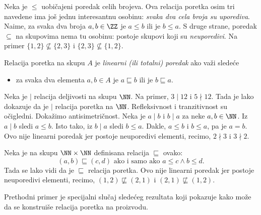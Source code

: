 Neka je $\le$ uobi\v cajeni poredak celih brojeva. Ova relacija poretka osim tri navedene ima jo\v s jednu
interesantnu osobinu: \emph{svaka dva cela broja su uporediva}.
Naime, za svaka dva broja $a, b \in \ZZ$ je $a \le b$ ili je $b \le a$.
S druge strane, poredak $\subseteq$ na skupovima nema tu osobinu: postoje skupovi koji su \emph{neuporedivi}.
Na primer $\{1, 2\} \not\subseteq \{2, 3\}$ i $\{2, 3\} \not\subseteq \{1, 2\}$.

Relacija poretka na skupu $A$ je \emph{linearni (ili totalni) poredak} ako va\v zi slede\'ce
\begin{itemize}\itemsep -1.5pt
\item
  za svaka dva elementa $a, b \in A$ je $a \sqsubseteq b$ ili je $b \sqsubseteq a$.
\end{itemize}

\begin{EX}\label{ft07.ex.deljivost}
  Neka je $\mid$ relacija deljivosti na skupu $\NN$. Na primer, $3 \mid 12$ i $5 \nmid 12$. Tada je lako dokazuje da je
  $\mid$ relacija poretka na $\NN$. Refleksivnost i tranzitivnost su o\v cigledni. Doka\v zimo antisimetri\v cnost.
  Neka je $a \mid b$ i $b \mid a$ za neke $a, b \in \NN$. Iz $a \mid b$ sledi $a \le b$. Isto tako, iz $b \mid a$ sledi
  $b \le a$. Dakle, $a \le b$ i $b \le a$, pa je $a = b$. Ovo nije linearni poredak jer postoje neuporedivi elementi,
  recimo, $2 \nmid 3$ i $3 \nmid 2$.
\end{EX}

\begin{EX}
  Neka je na skupu $\NN \times \NN$ definisana relacija $\sqsubseteq$ ovako:
  $$
    (a, b) \sqsubseteq (c, d) \text{\ \ ako i samo ako\ \ } a \le c \land b \le d.
  $$
  Tada se lako vidi da je $\sqsubseteq$ relacija poretka. Ovo nije linearni poredak jer postoje neuporedivi elementi,
  recimo, $(1, 2) \not\sqsubseteq (2, 1)$ i $(2, 1) \not\sqsubseteq (1, 2)$.
\end{EX}

Prethodni primer je specijalni slu\v caj slede\'ceg rezultata koji pokazuje kako mo\v ze da se konstrui\v se
relacija poretka na proizvodu.

